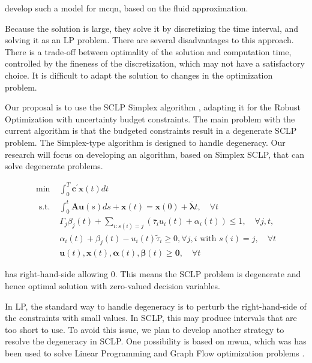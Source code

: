 \documentclass[11pt,a4paper,titlepage]{article}
\theoremstyle{definition}
\theoremstyle{plain}
\begin{document}
\Autocite{bertsimas2014robust} develop such a model for \gls{mcqn},
based on the fluid approximation.

Because the solution is large,
they solve it by discretizing the time interval,
and solving it as an LP problem.
There are several disadvantages to this approach.
There is a trade-off between optimality of the solution and computation time,
controlled by the fineness of the discretization,
which may not have a satisfactory choice.
It is difficult to adapt the solution to changes in the optimization problem.

Our proposal is to use the SCLP Simplex algorithm \autocite{weiss2008simplex,shindin2021application},
adapting it for the Robust Optimization with uncertainty budget constraints.
The main problem with the current algorithm is that the budgeted constraints result in a
degenerate SCLP problem.
The Simplex-type algorithm is designed to handle degeneracy.
Our research will focus on developing an algorithm,
based on Simplex SCLP,
that can solve degenerate problems.

\begin{align}
    \min & \int_{0}^{T} \mathbf{c}^{\prime} \mathbf{x}(t) d t \\
    \text { s.t. } & \int_{0}^{t} \mathbf{A} \mathbf{u}(s) d s+\mathbf{x}(t)=\mathbf{x}(0)+\overline{\boldsymbol{\lambda}} t, \quad \forall t \\
    & \Gamma_{j} \beta_{j}(t)+\sum_{i: s(i)=j}\left(\bar{\tau}_{i} u_{i}(t)+\alpha_{i}(t)\right) \leq 1, \quad \forall j, t, \\
    & \alpha_{i}(t)+\beta_{j}(t)-u_{i}(t) \tilde{\tau}_{i} \geq 0, \forall j, i \text { with } s(i)=j, \quad \forall t \label{eq:robust-sclp-mcqn-budgeted} \\
    & \mathbf{u}(t), \mathbf{x}(t), \boldsymbol{\alpha}(t), \boldsymbol{\beta}(t) \geq \mathbf{0}, \quad \forall t
\end{align}

 has right-hand-side allowing $0$.
This means the SCLP problem is degenerate and hence optimal solution with zero-valued
decision variables.

In LP,
the standard way to handle degeneracy is to perturb the right-hand-side
of the constraints with small values.
In SCLP,
this may produce intervals that are too short to use.
To avoid this issue,
we plan to develop another strategy to resolve the degeneracy in SCLP.
One possibility is based on \gls{mwua},
which was has been used to solve Linear Programming and Graph Flow optimization problems \autocite{arora2012multiplicative}.
\end{document}
